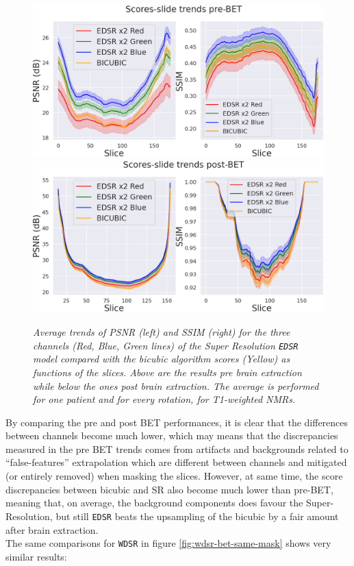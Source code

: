 \documentclass[12pt,a4paper]{report}
\begin{document}
\begin{figure}[H]
 \centering
 \includegraphics[scale=0.35]{./images/EDSR_score_t1_prebet.png} 
 \includegraphics[scale=0.35]{./images/EDSR_score_slide_t1_betted.png}
 \caption{\it Average trends of PSNR (left) and SSIM (right) for the three channels (Red, Blue, Green lines) of the Super Resolution {\tt EDSR} model compared with the bicubic algorithm scores (Yellow) as functions of the slices. Above are the results pre brain extraction while below the ones post brain extraction. The average is performed for one patient and for every rotation, for T1-weighted NMRs.}
 \label{fig:edsr-bet-same-mask}
\end{figure}

By comparing the pre and post BET performances, it is clear that the differences between channels become much lower, which may means that the discrepancies measured in the pre BET trends comes from artifacts and backgrounds related to ``false-features'' extrapolation which are different between channels and mitigated (or entirely removed) when masking the slices.
However, at same time, the score discrepancies between bicubic and SR also become much lower than pre-BET, meaning that, on average, the background components does favour the Super-Resolution, but still {\tt EDSR} beats the upsampling of the bicubic by a fair amount after brain extraction.
\\
The same comparisons for {\tt WDSR} in figure \ref{fig:wdsr-bet-same-mask} shows very similar results:
\end{document}
